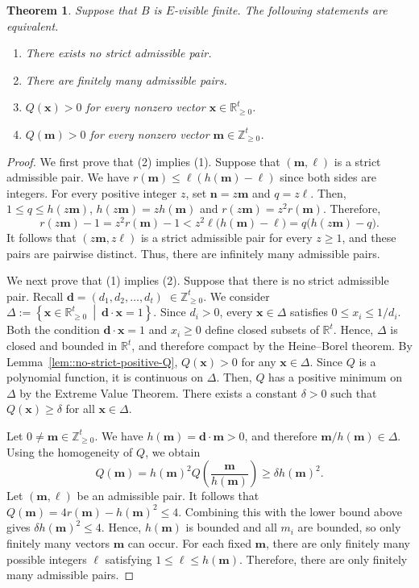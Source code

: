 \documentclass[a4,12pt]{amsart}
\numberwithin{equation}{section} %
\newtheorem{theorem}{Theorem}[section] %
\theoremstyle{definition} %
\begin{document}
\begin{theorem}\label{thm:strict-pairs}
Suppose that $B$ is $E$-visible finite. The following statements are equivalent.
\begin{enumerate}
\item There exists no strict admissible pair.
\item There are finitely many admissible pairs. 
\item $Q(\mathbf{x})>0$ for every nonzero vector $\mathbf{x}\in\mathbb{R}_{\geq 0}^t$. 
\item $Q(\mathbf{m})>0$ for every nonzero vector $\mathbf{m}\in\mathbb{Z}_{\geq 0}^t$. 
\end{enumerate}
\end{theorem} 
\begin{proof} 
We first prove that (2) implies (1). Suppose that $(\mathbf{m},\ell)$ is a strict admissible pair. We have $r(\mathbf{m})\leq\ell(h(\mathbf{m})-\ell)$ since both sides are integers. For every positive integer $z$, set $\mathbf{n}=z\mathbf{m}$ and $q=z\ell$. Then, $1\leq q\leq h(z\mathbf{m})$, $h(z\mathbf{m})=z h(\mathbf{m})$ and $r(z\mathbf{m})=z^2 r(\mathbf{m})$. Therefore,
\[
r(z\mathbf{m})-1 = z^2r(\mathbf{m})-1 < z^2\ell\bigl(h(\mathbf{m})-\ell\bigr) = q\bigl(h(z\mathbf{m})-q\bigr).
\]
It follows that $(z\mathbf{m},z\ell)$ is a strict admissible pair for every $z\geq1$, and these pairs are pairwise distinct.
Thus, there are infinitely many admissible pairs. 

We next prove that (1) implies (2). Suppose that there is no strict admissible pair. Recall $\mathbf{d}=(d_1,d_2,\ldots,d_t) \; \in \mathbb{Z}_{\geq 0}^t$. We consider $\Delta:=\left\{
\mathbf{x}\in\mathbb{R}_{\geq 0}^t
\ \middle|\
\mathbf{d}\cdot \mathbf{x}=1
\right\}$. Since $d_i>0$, every $\mathbf{x}\in\Delta$ satisfies $0\leq x_i\leq 1/d_i$. Both the condition $\mathbf{d}\cdot\mathbf{x}=1$ and $x_i\geq0$ define closed subsets of $\mathbb{R}^t$. Hence, $\Delta$ is closed and bounded in $\mathbb{R}^t$, and therefore compact by the Heine--Borel theorem.
By Lemma~\ref{lem::no-strict-positive-Q}, $Q(\mathbf{x})>0$ for any $\mathbf{x}\in\Delta$. Since $Q$ is a polynomial function, it is continuous on $\Delta$. Then, $Q$ has a positive minimum on $\Delta$ by the Extreme Value Theorem. There exists a constant $\delta>0$ such that $Q(\mathbf{x})\geq\delta$ for all $\mathbf{x}\in\Delta$.

Let $0\neq\mathbf{m}\in\mathbb{Z}_{\geq 0}^t$. We have $h(\mathbf{m})=\mathbf{d}\cdot \mathbf{m}>0$, and therefore $\mathbf{m}/h(\mathbf{m})\in\Delta$. Using the homogeneity of $Q$, we obtain
\[
Q(\mathbf{m}) = h(\mathbf{m})^2 Q\left(\frac{\mathbf{m}}{h(\mathbf{m})}\right)
\geq \delta h(\mathbf{m})^2.
\]
Let $(\mathbf{m},\ell)$ be an admissible pair. It follows that $Q(\mathbf{m}) = 4r(\mathbf{m})-h(\mathbf{m})^2 \leq 4$. Combining this with the lower bound above gives $\delta h(\mathbf{m})^2\leq 4$. Hence, $h(\mathbf{m})$ is bounded and all $m_i$ are bounded, so only finitely many vectors $\mathbf{m}$ can occur. For each fixed $\mathbf{m}$, there are only finitely many possible integers $\ell$ satisfying $1\leq\ell\leq h(\mathbf{m})$. Therefore, there are only finitely many admissible pairs.


\end{proof}
\end{document}
